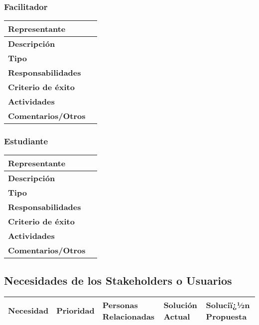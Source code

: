 \documentclass{article}
\begin{document}
	\subsubsection{Facilitador}
	\begin{center}
		\begin{tabular}{| p{} | p{}|}
		 \hline  %
		\raggedright
		\textbf{Representante} & 
		\\ \hline
		\textbf{Descripción} & \\ \hline
		\textbf{Tipo} & \\ \hline
		\textbf{Responsabilidades} & \\ \hline
		\textbf{Criterio de éxito} & \\ \hline
		\textbf{Actividades} & \\ \hline
		\textbf{Comentarios/Otros} & \\ \hline
		\end{tabular}
	\end{center}

	\subsubsection{Estudiante}
	\begin{center}
		\begin{tabular}{| p{} | p{}|}
		 \hline  %
		\raggedright
		\textbf{Representante} & \\ \hline
		\textbf{Descripción} & \\ \hline
		\textbf{Tipo} &  \\ \hline
		\textbf{Responsabilidades} & \\ \hline
		\textbf{Criterio de éxito} & \\ \hline
		\textbf{Actividades} & \\ \hline
		\textbf{Comentarios/Otros} & \\ \hline
		\end{tabular}
	\end{center}

	\subsection{Necesidades de los Stakeholders o Usuarios}
	\begin{center}
		\begin{tabular}{| p{} | p{} | p{} | p{} | p{}|}
		\hline  %
			\raggedright
			Necesidad & Prioridad & Personas \linebreak Relacionadas & Solución Actual & Soluciï¿½n \linebreak Propuesta \\ \hline
			
		
		\end{tabular}
	\end{center}
	
\end{document}
